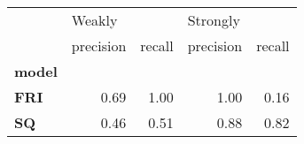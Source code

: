 \begin{tabular}{lrrrr}
\toprule
{} & \multicolumn{2}{l}{Weakly} & \multicolumn{2}{l}{Strongly} \\
{} & precision & recall & precision & recall \\
\textbf{model} &           &        &           &        \\
\midrule
\textbf{FRI  } &      0.69 &   1.00 &      1.00 &   0.16 \\
\textbf{SQ   } &      0.46 &   0.51 &      0.88 &   0.82 \\
\bottomrule
\end{tabular}
